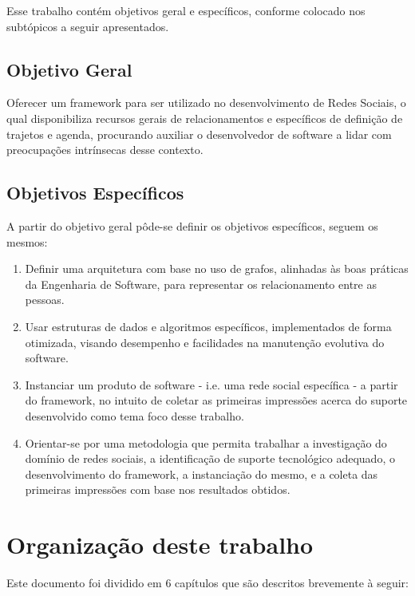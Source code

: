 Esse trabalho contém objetivos geral e específicos, conforme colocado nos subtópicos a seguir apresentados.

\subsection{Objetivo Geral}

Oferecer um framework para ser utilizado no desenvolvimento de Redes Sociais, o qual disponibiliza recursos gerais de relacionamentos e específicos de definição de trajetos e agenda, procurando auxiliar o desenvolvedor de software a lidar com preocupações intrínsecas desse contexto.

\subsection{Objetivos Específicos}

A partir do objetivo geral pôde-se definir os objetivos específicos, seguem os mesmos:

\begin{enumerate}
	\item Definir uma arquitetura com base no uso de grafos, alinhadas às boas práticas da Engenharia de Software, para representar os relacionamento entre as pessoas.
	\item Usar estruturas de dados e algoritmos específicos, implementados de forma otimizada, visando desempenho e facilidades na manutenção evolutiva do software.
	\item Instanciar um produto de software - i.e. uma rede social específica - a partir do framework, no intuito de coletar as primeiras impressões acerca do suporte desenvolvido como tema foco desse trabalho.
	\item Orientar-se por uma metodologia que permita trabalhar a investigação do domínio de redes sociais, a identificação de suporte tecnológico adequado, o desenvolvimento do framework, a instanciação do mesmo, e a coleta das primeiras impressões com base nos resultados obtidos.
\end{enumerate}

\section{Organização deste trabalho}

Este documento foi dividido em 6 capítulos que são descritos brevemente à seguir:
